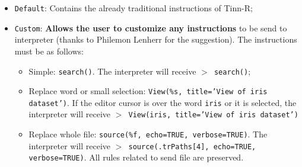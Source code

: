 \begin{itemize}
\item \texttt{Default}: Contains the already traditional instructions of Tinn-R;
\item \texttt{Custom}: \textbf{Allows the user to customize any instructions} to be send to \RR{} interpreter (thanks to Philemon Lenherr for the suggestion). The instructions must be as follows:
 \begin{itemize}
 \item Simple: \texttt{search()}. The \RR{} interpreter will receive \texttt{$>$ search()};
 \item Replace word or small selection: \texttt{View(\%s, title='View of iris dataset')}.
   If the editor cursor is over the word \texttt{iris} or it is selected,
   the \RR{} interpreter will receive \texttt{$>$ View(iris, title='View of iris dataset')}
 \item Replace whole file: \texttt{source(\%f, echo=TRUE, verbose=TRUE)}.
   The \RR{} interpreter will receive \texttt{$>$ source(.trPaths[4], echo=TRUE, verbose=TRUE)}.
   All rules related to send file are preserved.
 \end{itemize}
\end{itemize}
